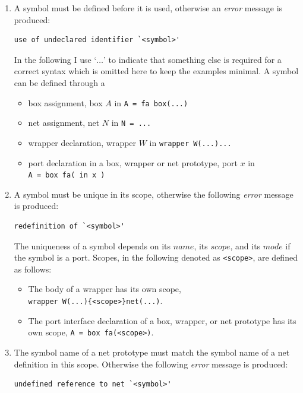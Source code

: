 \begin{enumerate}
    \item A symbol must be defined before it is used, otherwise an \emph{error} message is produced:
\begin{lstlisting}[style=msg]
use of undeclared identifier `<symbol>'
\end{lstlisting}
        In the following I use `$\dots$' to indicate that something else is required for a correct syntax which is omitted here to keep the examples minimal.
        A symbol can be defined through a
        \begin{itemize}
            \item box assignment, \eg box $A$ in \lstinline|A = fa box(...)|
            \item net assignment, \eg net $N$ in \lstinline|N = ...|
            \item wrapper declaration, \eg wrapper $W$ in \lstinline|wrapper W(...)...|
            \item port declaration in a box, wrapper or net prototype, \eg port $x$ in\\
                \mbox{\lstinline|A = box fa( in x )|}
        \end{itemize}

    \item A symbol must be unique in its scope, otherwise the following \emph{error} message is produced:
\begin{lstlisting}[style=msg]
redefinition of `<symbol>'
\end{lstlisting}
        The uniqueness of a symbol depends on its $name$, its $scope$, and its $mode$ if the symbol is a port.
        Scopes, in the following denoted as \texttt{<scope>}, are defined as follows:
        \begin{itemize}
            \item The body of a wrapper has its own scope, \\
                \eg \lstinline|wrapper W(...){<scope>}net(...)|.
            \item The port interface declaration of a box, wrapper, or net prototype has its own scope, \eg \lstinline|A = box fa(<scope>)|.
        \end{itemize}

    \item The symbol name of a net prototype must match the symbol name of a net definition in this scope.
        Otherwise the following \emph{error} message is produced:
\begin{lstlisting}[style=msg]
undefined reference to net `<symbol>'
\end{lstlisting}


\end{enumerate}
